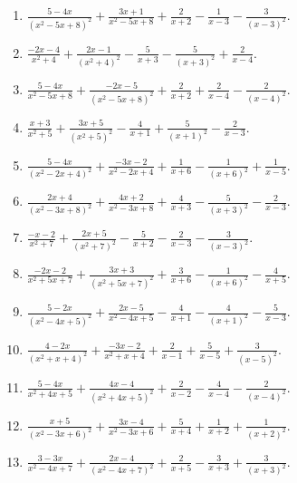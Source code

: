 \documentclass[11pt,oneside]{book}
\begin{document}
\begin{enumerate}[leftmargin=*,label=\textbf{Y\arabic*.},itemsep=0.45\baselineskip]
\item $\displaystyle \frac{5 - 4 x}{\left(x^{2} - 5 x + 8\right)^{2}} + \frac{3 x + 1}{x^{2} - 5 x + 8} + \frac{2}{x + 2} - \frac{1}{x - 3} - \frac{3}{\left(x - 3\right)^{2}}$.
\item $\displaystyle \frac{- 2 x - 4}{x^{2} + 4} + \frac{2 x - 1}{\left(x^{2} + 4\right)^{2}} - \frac{5}{x + 3} - \frac{5}{\left(x + 3\right)^{2}} + \frac{2}{x - 4}$.
\item $\displaystyle \frac{5 - 4 x}{x^{2} - 5 x + 8} + \frac{- 2 x - 5}{\left(x^{2} - 5 x + 8\right)^{2}} + \frac{2}{x + 2} + \frac{2}{x - 4} - \frac{2}{\left(x - 4\right)^{2}}$.
\item $\displaystyle \frac{x + 3}{x^{2} + 5} + \frac{3 x + 5}{\left(x^{2} + 5\right)^{2}} - \frac{4}{x + 1} + \frac{5}{\left(x + 1\right)^{2}} - \frac{2}{x - 3}$.
\item $\displaystyle \frac{5 - 4 x}{\left(x^{2} - 2 x + 4\right)^{2}} + \frac{- 3 x - 2}{x^{2} - 2 x + 4} + \frac{1}{x + 6} - \frac{1}{\left(x + 6\right)^{2}} + \frac{1}{x - 5}$.
\item $\displaystyle \frac{2 x + 4}{\left(x^{2} - 3 x + 8\right)^{2}} + \frac{4 x + 2}{x^{2} - 3 x + 8} + \frac{4}{x + 3} - \frac{5}{\left(x + 3\right)^{2}} - \frac{2}{x - 3}$.
\item $\displaystyle \frac{- x - 2}{x^{2} + 7} + \frac{2 x + 5}{\left(x^{2} + 7\right)^{2}} - \frac{5}{x + 2} - \frac{2}{x - 3} - \frac{3}{\left(x - 3\right)^{2}}$.
\item $\displaystyle \frac{- 2 x - 2}{x^{2} + 5 x + 7} + \frac{3 x + 3}{\left(x^{2} + 5 x + 7\right)^{2}} + \frac{3}{x + 6} - \frac{1}{\left(x + 6\right)^{2}} - \frac{4}{x + 5}$.
\item $\displaystyle \frac{5 - 2 x}{\left(x^{2} - 4 x + 5\right)^{2}} + \frac{2 x - 5}{x^{2} - 4 x + 5} - \frac{4}{x + 1} - \frac{4}{\left(x + 1\right)^{2}} - \frac{5}{x - 3}$.
\item $\displaystyle \frac{4 - 2 x}{\left(x^{2} + x + 4\right)^{2}} + \frac{- 3 x - 2}{x^{2} + x + 4} + \frac{2}{x - 1} + \frac{5}{x - 5} + \frac{3}{\left(x - 5\right)^{2}}$.
\item $\displaystyle \frac{5 - 4 x}{x^{2} + 4 x + 5} + \frac{4 x - 4}{\left(x^{2} + 4 x + 5\right)^{2}} + \frac{2}{x - 2} - \frac{4}{x - 4} - \frac{2}{\left(x - 4\right)^{2}}$.
\item $\displaystyle \frac{x + 5}{\left(x^{2} - 3 x + 6\right)^{2}} + \frac{3 x - 4}{x^{2} - 3 x + 6} + \frac{5}{x + 4} + \frac{1}{x + 2} + \frac{1}{\left(x + 2\right)^{2}}$.
\item $\displaystyle \frac{3 - 3 x}{x^{2} - 4 x + 7} + \frac{2 x - 4}{\left(x^{2} - 4 x + 7\right)^{2}} + \frac{2}{x + 5} - \frac{3}{x + 3} + \frac{3}{\left(x + 3\right)^{2}}$.

\end{enumerate}
\end{document}
